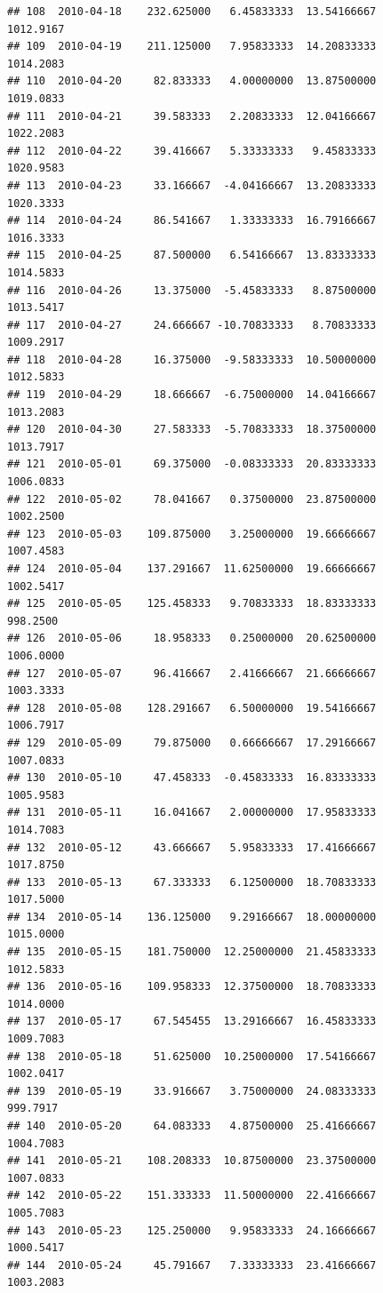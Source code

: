 \documentclass[
]{article}
\begin{document}
\begin{verbatim}
## 108  2010-04-18    232.625000   6.45833333  13.54166667    1012.9167
## 109  2010-04-19    211.125000   7.95833333  14.20833333    1014.2083
## 110  2010-04-20     82.833333   4.00000000  13.87500000    1019.0833
## 111  2010-04-21     39.583333   2.20833333  12.04166667    1022.2083
## 112  2010-04-22     39.416667   5.33333333   9.45833333    1020.9583
## 113  2010-04-23     33.166667  -4.04166667  13.20833333    1020.3333
## 114  2010-04-24     86.541667   1.33333333  16.79166667    1016.3333
## 115  2010-04-25     87.500000   6.54166667  13.83333333    1014.5833
## 116  2010-04-26     13.375000  -5.45833333   8.87500000    1013.5417
## 117  2010-04-27     24.666667 -10.70833333   8.70833333    1009.2917
## 118  2010-04-28     16.375000  -9.58333333  10.50000000    1012.5833
## 119  2010-04-29     18.666667  -6.75000000  14.04166667    1013.2083
## 120  2010-04-30     27.583333  -5.70833333  18.37500000    1013.7917
## 121  2010-05-01     69.375000  -0.08333333  20.83333333    1006.0833
## 122  2010-05-02     78.041667   0.37500000  23.87500000    1002.2500
## 123  2010-05-03    109.875000   3.25000000  19.66666667    1007.4583
## 124  2010-05-04    137.291667  11.62500000  19.66666667    1002.5417
## 125  2010-05-05    125.458333   9.70833333  18.83333333     998.2500
## 126  2010-05-06     18.958333   0.25000000  20.62500000    1006.0000
## 127  2010-05-07     96.416667   2.41666667  21.66666667    1003.3333
## 128  2010-05-08    128.291667   6.50000000  19.54166667    1006.7917
## 129  2010-05-09     79.875000   0.66666667  17.29166667    1007.0833
## 130  2010-05-10     47.458333  -0.45833333  16.83333333    1005.9583
## 131  2010-05-11     16.041667   2.00000000  17.95833333    1014.7083
## 132  2010-05-12     43.666667   5.95833333  17.41666667    1017.8750
## 133  2010-05-13     67.333333   6.12500000  18.70833333    1017.5000
## 134  2010-05-14    136.125000   9.29166667  18.00000000    1015.0000
## 135  2010-05-15    181.750000  12.25000000  21.45833333    1012.5833
## 136  2010-05-16    109.958333  12.37500000  18.70833333    1014.0000
## 137  2010-05-17     67.545455  13.29166667  16.45833333    1009.7083
## 138  2010-05-18     51.625000  10.25000000  17.54166667    1002.0417
## 139  2010-05-19     33.916667   3.75000000  24.08333333     999.7917
## 140  2010-05-20     64.083333   4.87500000  25.41666667    1004.7083
## 141  2010-05-21    108.208333  10.87500000  23.37500000    1007.0833
## 142  2010-05-22    151.333333  11.50000000  22.41666667    1005.7083
## 143  2010-05-23    125.250000   9.95833333  24.16666667    1000.5417
## 144  2010-05-24     45.791667   7.33333333  23.41666667    1003.2083

\end{verbatim}
\end{document}
